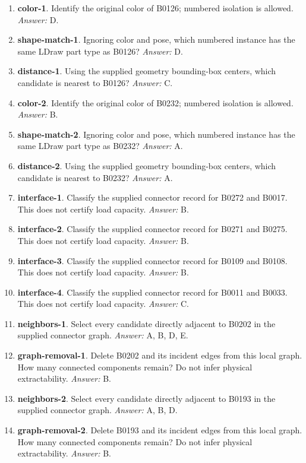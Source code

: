 \begin{enumerate}
\item \textbf{color-1}. Identify the original color of B0126; numbered isolation is allowed. \textit{Answer:} D.
\item \textbf{shape-match-1}. Ignoring color and pose, which numbered instance has the same LDraw part type as B0126? \textit{Answer:} D.
\item \textbf{distance-1}. Using the supplied geometry bounding-box centers, which candidate is nearest to B0126? \textit{Answer:} C.
\item \textbf{color-2}. Identify the original color of B0232; numbered isolation is allowed. \textit{Answer:} B.
\item \textbf{shape-match-2}. Ignoring color and pose, which numbered instance has the same LDraw part type as B0232? \textit{Answer:} A.
\item \textbf{distance-2}. Using the supplied geometry bounding-box centers, which candidate is nearest to B0232? \textit{Answer:} A.
\item \textbf{interface-1}. Classify the supplied connector record for B0272 and B0017. This does not certify load capacity. \textit{Answer:} B.
\item \textbf{interface-2}. Classify the supplied connector record for B0271 and B0275. This does not certify load capacity. \textit{Answer:} B.
\item \textbf{interface-3}. Classify the supplied connector record for B0109 and B0108. This does not certify load capacity. \textit{Answer:} B.
\item \textbf{interface-4}. Classify the supplied connector record for B0011 and B0033. This does not certify load capacity. \textit{Answer:} C.
\item \textbf{neighbors-1}. Select every candidate directly adjacent to B0202 in the supplied connector graph. \textit{Answer:} A, B, D, E.
\item \textbf{graph-removal-1}. Delete B0202 and its incident edges from this local graph. How many connected components remain? Do not infer physical extractability. \textit{Answer:} B.
\item \textbf{neighbors-2}. Select every candidate directly adjacent to B0193 in the supplied connector graph. \textit{Answer:} A, B, D.
\item \textbf{graph-removal-2}. Delete B0193 and its incident edges from this local graph. How many connected components remain? Do not infer physical extractability. \textit{Answer:} B.

\end{enumerate}
